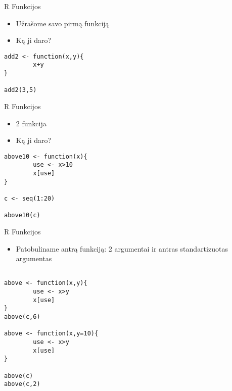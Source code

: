 \documentclass[11pt,xcolor=table]{beamer}
\begin{document}
\subsubsection{}

\begin{frame}[fragile]{R Funkcijos}
\begin{itemize}
\item Užrašome savo pirmą funkciją
\item Ką ji daro?
\end{itemize}
\begin{lstlisting}
add2 <- function(x,y){
        x+y
}

add2(3,5)
\end{lstlisting}
\end{frame}

\begin{frame}[fragile]{R Funkcijos}
\begin{itemize}
\item 2 funkcija
\item Ką ji daro?
\end{itemize}
\begin{lstlisting}
above10 <- function(x){
        use <- x>10
        x[use]
}

c <- seq(1:20)

above10(c)
\end{lstlisting}
\end{frame}


\begin{frame}[fragile]{R Funkcijos}
\begin{itemize}
\item Patobuliname antrą funkciją: 2 argumentai ir antras standartizuotas argumentas
\end{itemize}
\begin{lstlisting}

above <- function(x,y){
        use <- x>y
        x[use]
}
above(c,6)

above <- function(x,y=10){
        use <- x>y
        x[use]
}

above(c)
above(c,2)
\end{lstlisting}
\end{frame}

\end{document}

